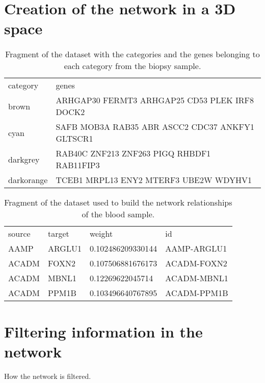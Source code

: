 \section{Creation of the network in a 3D space}

\begin{table}[h!]
\centering
\begin{tabular}{ll}
\hline
category & genes          \\
brown   & ARHGAP30 FERMT3 ARHGAP25 CD53 PLEK IRF8 DOCK2\\
cyan  & SAFB MOB3A RAB35 ABR ASCC2 CDC37 ANKFY1 GLTSCR1\\
darkgrey  & RAB40C ZNF213 ZNF263 PIGQ RHBDF1 RAB11FIP3\\
darkorange  & TCEB1 MRPL13 ENY2 MTERF3 UBE2W WDYHV1\\
\hline
\end{tabular}
\caption{Fragment of the dataset with the categories and the genes belonging to each category from the biopsy sample.}
\label{tab:categories-data}
\end{table}

\begin{table}[h!]
\centering
\begin{tabular}{llll}
\hline
source & target & weight            & id          \\
AAMP   & ARGLU1 & 0.102486209330144 & AAMP-ARGLU1 \\
ACADM  & FOXN2  & 0.107506881676173 & ACADM-FOXN2 \\
ACADM  & MBNL1  & 0.12269622045714  & ACADM-MBNL1 \\
ACADM  & PPM1B  & 0.103496640767895 & ACADM-PPM1B \\
\hline
\end{tabular}
\caption{Fragment of the dataset used to build the network relationships of the blood sample.}
\label{tab:network-data}
\end{table}

\section{Filtering information in the network}
How the network is filtered.
